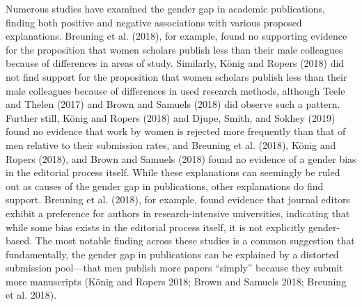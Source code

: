 \documentclass[
]{ccr}
\begin{document}
Numerous studies have examined the gender gap in academic publications,
finding both positive and negative associations with various proposed
explanations. Breuning et al. (2018), for example, found no supporting
evidence for the proposition that women scholars publish less than their
male colleagues because of differences in areas of study. Similarly,
König and Ropers (2018) did not find support for the proposition that
women scholars publish less than their male colleagues because of
differences in used research methods, although Teele and Thelen (2017)
and Brown and Samuels (2018) did observe such a pattern. Further still,
König and Ropers (2018) and Djupe, Smith, and Sokhey (2019) found no
evidence that work by women is rejected more frequently than that of men
relative to their submission rates, and Breuning et al. (2018), König
and Ropers (2018), and Brown and Samuels (2018) found no evidence of a
gender bias in the editorial process itself. While these explanations
can seemingly be ruled out as causes of the gender gap in publications,
other explanations do find support. Breuning et al. (2018), for example,
found evidence that journal editors exhibit a preference for authors in
research-intensive universities, indicating that while some bias exists
in the editorial process itself, it is not explicitly gender-based. The
most notable finding across these studies is a common suggestion that
fundamentally, the gender gap in publications can be explained by a
distorted submission pool---that men publish more papers ``simply''
because they submit more manuscripts (König and Ropers 2018; Brown and
Samuels 2018; Breuning et al. 2018).
\end{document}

